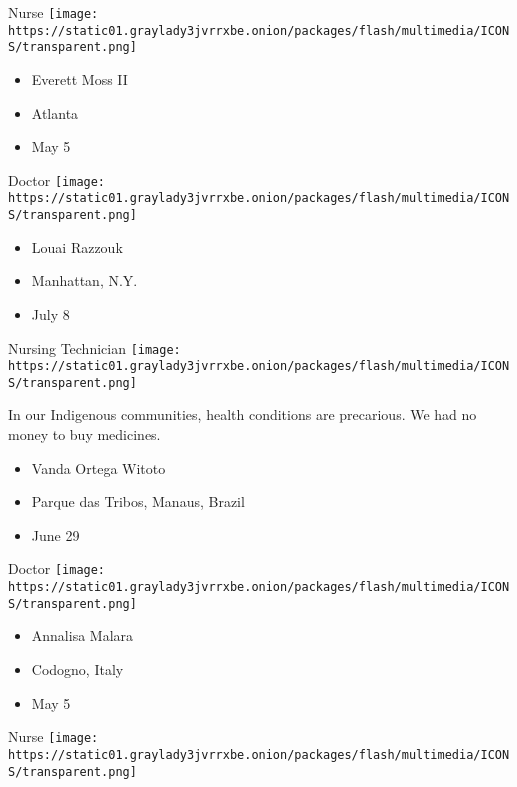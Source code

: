 \protect\hyperlink{item-everett-moss-ii}{}

Nurse
\texttt{[image: https://static01.graylady3jvrrxbe.onion/packages/flash/multimedia/ICONS/transparent.png]}

\begin{itemize}
\tightlist
\item
  Everett Moss II
\item
  Atlanta
\item
  May 5
\end{itemize}

\protect\hyperlink{item-louai-razzouk}{}

Doctor
\texttt{[image: https://static01.graylady3jvrrxbe.onion/packages/flash/multimedia/ICONS/transparent.png]}

\begin{itemize}
\tightlist
\item
  Louai Razzouk
\item
  Manhattan, N.Y.
\item
  July 8
\end{itemize}

\protect\hyperlink{item-vanda-ortega-witoto}{}

Nursing Technician
\texttt{[image: https://static01.graylady3jvrrxbe.onion/packages/flash/multimedia/ICONS/transparent.png]}

In our Indigenous communities, health conditions are precarious. We had
no money to buy medicines.

\begin{itemize}
\tightlist
\item
  Vanda Ortega Witoto
\item
  Parque das Tribos, Manaus, Brazil
\item
  June 29
\end{itemize}

\protect\hyperlink{item-annalisa-malara}{}

Doctor
\texttt{[image: https://static01.graylady3jvrrxbe.onion/packages/flash/multimedia/ICONS/transparent.png]}

\begin{itemize}
\tightlist
\item
  Annalisa Malara
\item
  Codogno, Italy
\item
  May 5
\end{itemize}

\protect\hyperlink{item-kim-hyeon-hee}{}

Nurse
\texttt{[image: https://static01.graylady3jvrrxbe.onion/packages/flash/multimedia/ICONS/transparent.png]}

